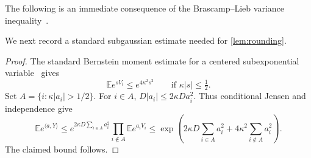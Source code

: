 \documentclass[11pt,reqno]{amsart}
\newtheorem{lemma}[theorem]{Lemma}
\newcommand{\E}{\mathbb E}
\newcommand{\R}{\mathbb R}
\newcommand{\ip}[2]{\langle #1,#2\rangle}
\begin{document}
The following is an immediate consequence of the Brascamp--Lieb
variance inequality~\cite[Theorem~4.1]{BrascampLieb}.


We next record a standard subgaussian estimate needed for
\cref{lem:rounding}.


\begin{proof}
The standard Bernstein moment estimate for a centered subexponential
variable~\cite[proof of Proposition~2.8.1]{Vershynin} gives
\[
 \E e^{sV_i}\leq e^{4\kappa^2s^2}
 \qquad\text{if }\kappa|s|\leq\tfrac12.
\]
Set $A=\{i:\kappa|a_i|>1/2\}$. For $i\in A$,
$D|a_i|\leq2\kappa D a_i^2$. Thus conditional Jensen and independence
give
\[
 \E e^{\ip{a}{Y}}
 \leq
 e^{2\kappa D\sum_{i\in A}a_i^2}
 \prod_{i\notin A}\E e^{a_iV_i}
 \leq
 \exp\left(
  2\kappa D\sum_{i\in A}a_i^2
  +4\kappa^2\sum_{i\notin A}a_i^2
 \right).
\]
The claimed bound follows.
\end{proof}

\end{document}
